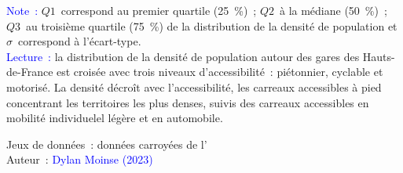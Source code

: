         \begin{table}[h!]
        \centering
        \renewcommand{\arraystretch}{1.5}
    \caption{Distribution de la densité de population en fonction des niveaux d'accessibilité autour des gares de la région Hauts-de-France.}
    \label{table-chap5:analyse-bivariee-densite-accessibilite}
        \vspace{5pt}
        \begin{flushleft}\scriptsize{
        \textcolor{blue}{Note~:} \(Q1\)~correspond au premier quartile (25~\%)~; \(Q2\)~à la médiane (50~\%)~; \(Q3\)~au troisième quartile (75~\%) de la distribution de la densité de population et $\sigma$~correspond à l'écart-type.
        \\
        \textcolor{blue}{Lecture~:} la distribution de la densité de population autour des gares des Hauts-de-France est croisée avec trois niveaux d'accessibilité~: piétonnier, cyclable et motorisé. La densité décroît avec l'accessibilité, les carreaux accessibles à pied concentrant les territoires les plus denses, suivis des carreaux accessibles en mobilité individuelel légère et en automobile.
        }\end{flushleft}
        \begin{flushright}\scriptsize
        Jeux de données~: données carroyées de l'\textcolor{blue}{\textcite{insee_grille_2021}}
        \\
        Auteur~: \textcolor{blue}{Dylan Moinse (2023)}
        \end{flushright}
        \end{table}